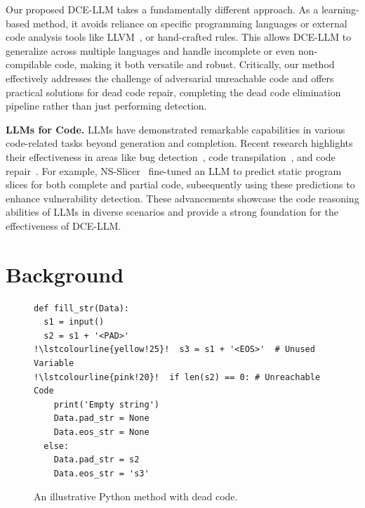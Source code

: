 \documentclass[11pt]{article}
\newcommand{\lstcolourline}[1]{\rlap{\color{#1}\rule[-.3\baselineskip]{7.35cm}{\baselineskip}}}
\begin{document}
Our proposed DCE-LLM takes a fundamentally different approach.  As a learning-based method, it avoids reliance on specific programming languages or external code analysis tools like LLVM~\cite{wang2017dead}, or hand-crafted rules. This allows DCE-LLM to generalize across multiple languages and handle incomplete or even non-compilable code, making it both versatile and robust.  Critically, our method effectively addresses the challenge of adversarial unreachable code and offers practical solutions for dead code repair, completing the dead code elimination pipeline rather than just performing detection.



\textbf{LLMs for Code.} LLMs have demonstrated remarkable capabilities in various code-related tasks beyond generation and completion. Recent research highlights their effectiveness in areas like bug detection~\cite{wang-etal-2024-sanitizing}, code transpilation~\cite{bhatia2024verified}, and code repair~\cite{tang2024code, zhao-etal-2024-repair}. For example, NS-Slicer~\cite{yadavally2024learning} fine-tuned an LLM to predict static program slices for both complete and partial code, subsequently using these predictions to enhance vulnerability detection. These advancements showcase the code reasoning abilities of LLMs in diverse scenarios and provide a strong foundation for the effectiveness of DCE-LLM.

\section{Background}

\begin{figure}[!bp]
\begin{minipage}{\linewidth}
\small
\begin{lstlisting}[style=mystyle, escapechar=!]
def fill_str(Data):
  s1 = input()
  s2 = s1 + '<PAD>'
!\lstcolourline{yellow!25}!  s3 = s1 + '<EOS>'  # Unused Variable
!\lstcolourline{pink!20}!  if len(s2) == 0: # Unreachable Code
    print('Empty string')
    Data.pad_str = None
    Data.eos_str = None
  else:
    Data.pad_str = s2
    Data.eos_str = 's3'
\end{lstlisting}
\end{minipage}
\caption{An illustrative Python method with dead code.}
\label{fig1}
\end{figure}
\end{document}
